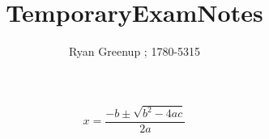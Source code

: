 \documentclass[12pt]{article}
\title{\color{coltit} \Huge TemporaryExamNotes}
\author{Ryan Greenup ; 1780-5315}
\begin{document}
\maketitle
\tableofcontents


$$
x= \frac{- b\pm \sqrt{b^2- 4ac}}{2a}
$$
 
\end{document}
